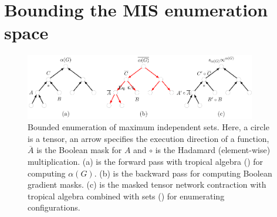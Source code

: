\documentclass[review, onefignum, onetabnum]{siamart190516}
\begin{document}
\section{Bounding the MIS enumeration space}\label{sec:bounding}
\begin{figure}
    \centering
    \includegraphics[width=0.9\textwidth, trim={0cm 0cm 0cm 0cm}, clip]{figures/masktree.pdf}
    \caption{Bounded enumeration of maximum independent sets. Here, a circle is a tensor, an arrow specifies the execution direction of a function, $\overline A$ is the Boolean mask for $A$ and $\circ$ is the Hadamard (element-wise) multiplication. (a) is the forward pass with tropical algebra () for computing $\alpha(G)$.
     (b) is the backward pass for computing Boolean gradient masks.
     (c) is the masked tensor network contraction with tropical algebra combined with sets () for enumerating configurations.}
     \label{fig:bounding}
\end{figure}
\end{document}
